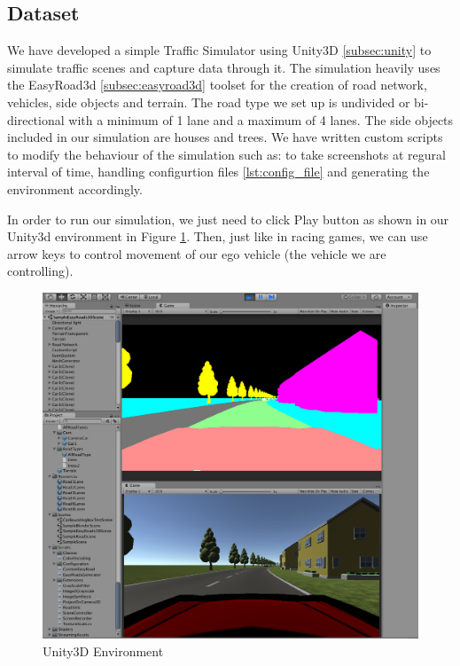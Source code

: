 \subsection{Dataset}
We have developed a simple Traffic Simulator using Unity3D \ref{subsec:unity} to simulate traffic scenes and capture data through it. The simulation heavily uses the EasyRoad3d \ref{subsec:easyroad3d} toolset for the creation of road network, vehicles, side objects and terrain. The road type we set up is undivided or bi-directional with a minimum of 1 lane and a maximum of 4 lanes. The side objects included in our simulation are houses and trees. We have written custom scripts to modify the behaviour of the simulation such as: to take screenshots at regural interval of time, handling configurtion files \ref{lst:config_file} and generating the environment accordingly.
\par
In order to run our simulation, we just need to click Play button as shown in our Unity3d environment in Figure \ref{unity_environment}. Then, just like in racing games, we can use arrow keys to control movement of our ego vehicle (the vehicle we are controlling).
\par
\begin{figure}[H]
  \centering
  \includegraphics[scale=0.40]{images/Chapter3/unity_environment.png}
  \caption{Unity3D Environment}
  \label{unity_environment}
\end{figure}
\par
